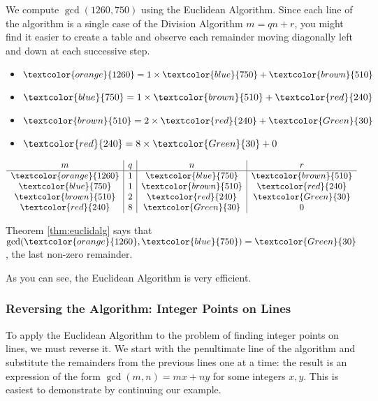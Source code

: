 \begin{example}
We compute $\gcd(1260,750)$ using the Euclidean Algorithm. Since each line of the algorithm is a single case of the Division Algorithm $m=qn+r$, you might find it easier to create a table and observe each remainder moving diagonally left and down at each successive step.

\noindent\begin{minipage}{0.5\textwidth}
\vspace*{10pt}
\begin{itemize}\setlength{\itemsep}{0pt}
  \item[]$\textcolor{orange}{1260}=1\times \textcolor{blue}{750}+\textcolor{brown}{510}$
  \item[]$\textcolor{blue}{750}=1\times \textcolor{brown}{510}+\textcolor{red}{240}$
  \item[]$\textcolor{brown}{510}=2\times \textcolor{red}{240}+\textcolor{Green}{30}$
  \item[]$\textcolor{red}{240}=8\times \textcolor{Green}{30}+0$
\end{itemize}
\end{minipage}
\begin{minipage}{0.5\textwidth}
\renewcommand{\arraystretch}{1.35}
$\begin{array}{c|c|c|c}
m&q&n&r\\\hline
\textcolor{orange}{1260}&1&\textcolor{blue}{750}&\textcolor{brown}{510}\\
\textcolor{blue}{750}&1&\textcolor{brown}{510}&\textcolor{red}{240}\\
\textcolor{brown}{510}&2&\textcolor{red}{240}&\textcolor{Green}{30}\\
\textcolor{red}{240}&8&\textcolor{Green}{30}&0
\end{array}$
\end{minipage}
Theorem \ref{thm:euclidalg} says that $\gcd(\textcolor{orange}{1260},\textcolor{blue}{750})=\textcolor{Green}{30}$, the last non-zero remainder.
\end{example}

\noindent As you can see, the Euclidean Algorithm is very efficient.

\subsubsection*{Reversing the Algorithm: Integer Points on Lines}

To apply the Euclidean Algorithm to the problem of finding integer points on lines, we must reverse it. We start with the penultimate line of the algorithm and substitute the remainders from the previous lines one at a time: the result is an expression of the form $\gcd(m,n)=mx+ny$ for some integers $x,y$. This is easiest to demonstrate by continuing our example.

